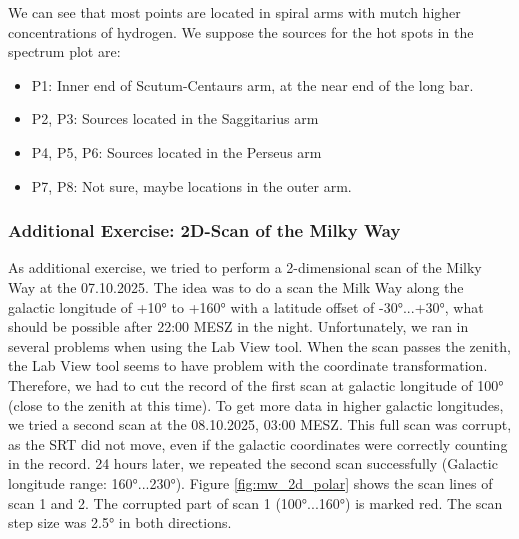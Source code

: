 We can see that most points are located in spiral arms with mutch higher concentrations of hydrogen. We suppose the sources for the hot spots in the spectrum plot are:
\begin{itemize}
	\item P1: Inner end of Scutum-Centaurs arm, at the near end of the long bar.
	\item P2, P3: Sources located in the Saggitarius arm
	\item P4, P5, P6: Sources located in the Perseus arm
	\item P7, P8: Not sure, maybe locations in the outer arm.
\end{itemize}

\pagebreak

\subsubsection{Additional Exercise: 2D-Scan of the Milky Way}\label{sec:MW_2D}
As additional exercise, we tried to perform a 2-dimensional scan of the Milky Way at the 07.10.2025. The idea was to do a scan the Milk Way along the galactic longitude of +10° to +160° with a latitude offset of -30°...+30°, what should be possible after 22:00 MESZ in the night. Unfortunately, we ran in several problems when using the Lab View tool. When the scan passes the zenith, the Lab View tool seems to have problem with the coordinate transformation. Therefore, we had to cut the record of the first scan at galactic longitude of 100° (close to the zenith at this time). To get more data in higher galactic longitudes, we tried a second scan at the 08.10.2025, 03:00 MESZ. This full scan was corrupt, as the SRT did not move, even if the galactic coordinates were correctly counting in the record. 24 hours later, we repeated the second scan successfully (Galactic longitude range: 160°...230°). Figure \ref{fig:mw_2d_polar} shows the scan lines of scan 1 and 2. The corrupted part of scan 1 (100°...160°) is marked red. The scan step size was 2.5° in both directions.

